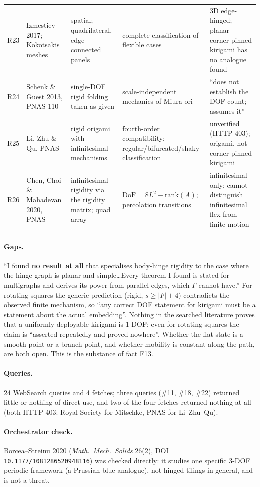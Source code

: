 \documentclass[10pt,a4paper]{article}
\newcommand{\fn}[1]{\nolinkurl{#1}}
\begin{document}
\begin{longtable}{@{}p{6mm}p{34mm}p{40mm}p{38mm}p{42mm}@{}}
R23 & Izmestiev 2017; Kokotsakis meshes & spatial; quadrilateral, edge-connected panels & complete classification of flexible cases & 3D edge-hinged; planar corner-pinned kirigami has no analogue found \\
R24 & Schenk \& Guest 2013, PNAS 110 & single-DOF rigid folding taken as given & scale-independent mechanics of Miura-ori & ``does not establish the DOF count; assumes it'' \\
R25 & Li, Zhu \& Qu, PNAS & rigid origami with infinitesimal mechanisms & fourth-order compatibility; regular/bifurcated/shaky classification & unverified (HTTP 403); origami, not corner-pinned kirigami \\
R26 & Chen, Choi \& Mahadevan 2020, PNAS & infinitesimal rigidity via the rigidity matrix; quad array & $\mathrm{DoF} = 8L^2 - \mathrm{rank}(A)$; percolation transitions & infinitesimal only; cannot distinguish infinitesimal flex from finite motion \\
\bottomrule
\end{longtable}

\paragraph{Gaps.} ``I found \textbf{no result at all} that specialises body-hinge rigidity to
the case where the hinge graph is planar and simple\ldots Every theorem I found is stated for
multigraphs and derives its power from parallel edges, which $\Gamma$ cannot have.'' For
rotating squares the generic prediction (rigid, $s\ge|F|+4$) contradicts the observed finite
mechanism, so ``any correct DOF statement for kirigami must be a statement about the actual
embedding''. Nothing in the searched literature proves that a uniformly deployable kirigami is
1-DOF; even for rotating squares the claim is ``asserted repeatedly and proved nowhere''.
Whether the flat state is a smooth point or a branch point, and whether mobility is constant
along the path, are both open. This is the substance of fact F13.

\paragraph{Queries.} 24 WebSearch queries and 4 fetches; three queries (\#11, \#18, \#22)
returned little or nothing of direct use, and two of the four fetches returned nothing at all
(both HTTP 403: Royal Society for Mitschke, PNAS for Li--Zhu--Qu).

\paragraph{Orchestrator check.} Borcea--Streinu 2020 (\emph{Math.\ Mech.\ Solids} 26(2), DOI
\fn{10.1177/1081286520948116}) was checked directly: it studies one specific 3-DOF periodic
framework (a Prussian-blue analogue), not hinged tilings in general, and is not a threat.
\end{document}
